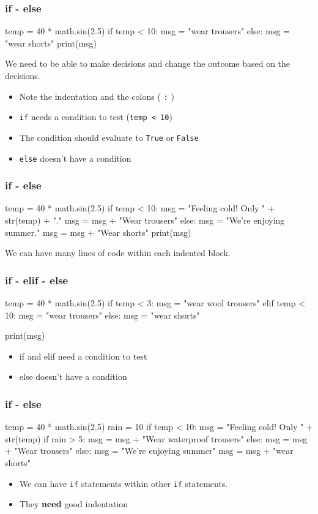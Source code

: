 \documentclass{beamer}
\begin{document}
\begin{frame}[fragile]
\frametitle{if - else}
\begin{code}
temp = 40 * math.sin(2.5)
if temp < 10:
   msg = "wear trousers"
else:
   msg = "wear shorts"
print(msg)
\end{code}
We need to be able to make decisions and change the
outcome based on the decisions.
\begin{itemize}
\item Note the indentation and the colons ( {\tt :} )
\item {\tt if} needs a condition to test ({\tt temp < 10})
\item The condition should evaluate to {\tt True} or {\tt False}
\item {\tt else} doesn't have a condition
\end{itemize}
\end{frame}

\begin{frame}[fragile]
\frametitle{if - else}
\begin{code}
temp = 40 * math.sin(2.5)
if temp < 10:
   msg = "Feeling cold! Only " + str(temp) + "."
   msg = msg + "Wear trousers"
else:
   msg = "We're enjoying summer."
   msg = msg + "Wear shorts"
print(msg)
\end{code}
We can have many lines of code within each indented
block.
\end{frame}


\begin{frame}[fragile]
\frametitle{if - elif - else}
\begin{code}
temp = 40 * math.sin(2.5)
if temp < 3:
   msg = "wear wool trousers"
elif temp < 10:
   msg = "wear trousers"
else:
   msg = "wear shorts"
  
print(msg)
\end{code}
\begin{itemize}
\item if and elif need a condition to test
\item else doesn't have a condition
\end{itemize}
\end{frame}

\begin{frame}[fragile]
\frametitle{if - else}
\begin{code}
temp = 40 * math.sin(2.5)
rain = 10
if temp < 10:
   msg = "Feeling cold! Only " + str(temp)
   if rain > 5:
      msg = msg + "Wear waterproof trousers"
   else:
      msg = msg + "Wear trousers"
else:
   msg = "We're enjoying summer"
   msg = msg + "wear shorts"
\end{code}
\begin{itemize}
\item We can have {\tt if} statements within other {\tt if}
statements.
\item They {\bf need} good indentation
\end{itemize}
\end{frame}
\end{document}
